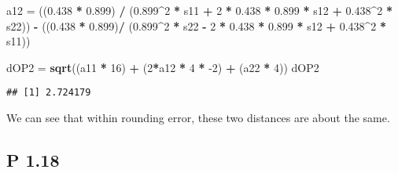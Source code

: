 \documentclass[
]{article}
\newenvironment{Shaded}{\begin{snugshade}}{\end{snugshade}}
\newcommand{\DecValTok}[1]{\textcolor[rgb]{0.00,0.00,0.81}{#1}}
\newcommand{\FloatTok}[1]{\textcolor[rgb]{0.00,0.00,0.81}{#1}}
\newcommand{\KeywordTok}[1]{\textcolor[rgb]{0.13,0.29,0.53}{\textbf{#1}}}
\newcommand{\NormalTok}[1]{#1}
\newcommand{\OperatorTok}[1]{\textcolor[rgb]{0.81,0.36,0.00}{\textbf{#1}}}
\newcommand{\StringTok}[1]{\textcolor[rgb]{0.31,0.60,0.02}{#1}}
\begin{document}
\begin{Shaded}
\begin{Highlighting}[]
\NormalTok{a12 =}\StringTok{ }\NormalTok{((}\FloatTok{0.438} \OperatorTok{*}\StringTok{ }\FloatTok{0.899}\NormalTok{) }\OperatorTok{/}\StringTok{ }\NormalTok{(}\FloatTok{0.899}\OperatorTok{^}\DecValTok{2} \OperatorTok{*}\StringTok{ }\NormalTok{s11 }\OperatorTok{+}\StringTok{ }\DecValTok{2} \OperatorTok{*}\StringTok{ }\FloatTok{0.438} \OperatorTok{*}\StringTok{ }\FloatTok{0.899} \OperatorTok{*}\StringTok{ }\NormalTok{s12 }\OperatorTok{+}\StringTok{ }\FloatTok{0.438}\OperatorTok{^}\DecValTok{2} \OperatorTok{*}\StringTok{ }\NormalTok{s22)) }\OperatorTok{-}\StringTok{ }\NormalTok{((}\FloatTok{0.438} \OperatorTok{*}\StringTok{ }\FloatTok{0.899}\NormalTok{)}\OperatorTok{/}\StringTok{ }\NormalTok{(}\FloatTok{0.899}\OperatorTok{^}\DecValTok{2} \OperatorTok{*}\StringTok{ }\NormalTok{s22 }\OperatorTok{-}\StringTok{ }\DecValTok{2} \OperatorTok{*}\StringTok{ }\FloatTok{0.438} \OperatorTok{*}\StringTok{ }\FloatTok{0.899} \OperatorTok{*}\StringTok{ }\NormalTok{s12 }\OperatorTok{+}\StringTok{ }\FloatTok{0.438}\OperatorTok{^}\DecValTok{2} \OperatorTok{*}\StringTok{ }\NormalTok{s11))}

\NormalTok{dOP2 =}\StringTok{ }\KeywordTok{sqrt}\NormalTok{((a11 }\OperatorTok{*}\StringTok{ }\DecValTok{16}\NormalTok{) }\OperatorTok{+}\StringTok{ }\NormalTok{(}\DecValTok{2}\OperatorTok{*}\NormalTok{a12 }\OperatorTok{*}\StringTok{ }\DecValTok{4} \OperatorTok{*}\StringTok{ }\DecValTok{-2}\NormalTok{) }\OperatorTok{+}\StringTok{ }\NormalTok{(a22 }\OperatorTok{*}\StringTok{ }\DecValTok{4}\NormalTok{))}
\NormalTok{dOP2}
\end{Highlighting}
\end{Shaded}

\begin{verbatim}
## [1] 2.724179
\end{verbatim}

We can see that within rounding error, these two distances are about the
same.

\hypertarget{p-1.18}{%
\subsection{P 1.18}\label{p-1.18}}
\end{document}
